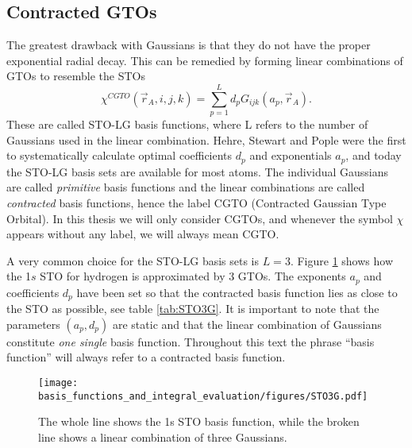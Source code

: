 \subsection{Contracted GTOs}
\label{subsec:contracted_gtos}
The greatest drawback with Gaussians is that they do not have the proper exponential radial decay. This can be remedied by forming linear combinations of GTOs
to resemble the STOs
\begin{equation}
 \chi^{CGTO}(\vec r_A,i,j,k) = \sum_{p=1}^L d_p G_{ijk}(a_p, \vec r_A).
\end{equation}
These are called STO-LG basis functions, where L refers to the number of Gaussians used in the linear combination. Hehre, Stewart and Pople \cite{pople}
were the first to systematically calculate optimal coefficients $d_p$ and exponentials $a_p$, and today the STO-LG basis sets are available
for most atoms.
The individual Gaussians are called \emph{primitive} basis functions and the linear combinations are called \emph{contracted} basis functions, hence the label
CGTO (Contracted Gaussian Type Orbital). In this thesis we will only consider CGTOs, and whenever the symbol $\chi$ appears without any label,
we will always mean CGTO. 

A very common choice for the STO-LG basis sets is $L=3$. Figure \ref{fig:STOvsSTO3G} shows how the 1$s$ STO for hydrogen is approximated by 3 GTOs.
The exponents $a_p$ and coefficients $d_p$ have been set so that the contracted basis function lies as close to the STO as possible, see
table \ref{tab:STO3G}. It is important to note that the parameters $(a_p,d_p)$ are static and that the linear combination of Gaussians constitute \emph{one single}
basis function. Throughout this text the phrase ``basis function'' will always refer to a contracted basis function.



\begin{figure}
 \begin{center}
  \texttt{[image: basis\_functions\_and\_integral\_evaluation/figures/STO3G.pdf]}
  \caption{The whole line shows the 1s STO basis function, while the broken line shows a linear combination of three Gaussians.}
  \label{fig:STOvsSTO3G}
 \end{center}
\end{figure}


